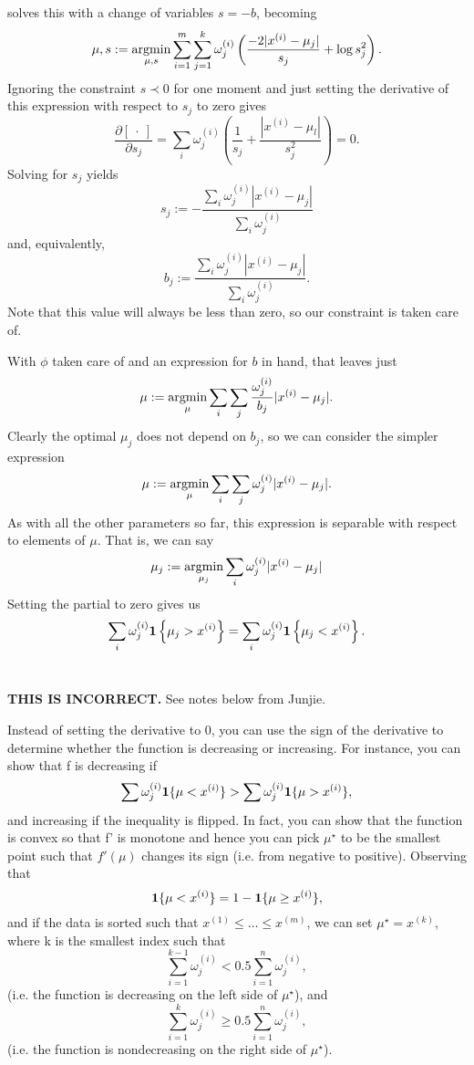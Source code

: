 \documentclass[12pt]{article}
\begin{document}
solves this with a change of variables $s = -b$, becoming
\[
\mu, s := \mathop{\rm argmin}_{\mu, s} \sum_{i=1}^m \sum_{j=1}^k \omega_j^{(i)} \left(  \frac{- 2 |x^{(i)} - \mu_j|}{s_j} + \log s_j^2 \right).
\]
Ignoring the constraint $s \prec 0$ for one moment and just setting the derivative of this expression with respect to $s_j$ to zero gives
\[
\frac{\partial \left[\ \cdot\ \right]}{\partial s_j} = \sum_i \omega_j^{(i)} \left( \frac{1}{s_j} + \frac{|x^{(i)} - \mu_l|}{s_j^2} \right) = 0.
\]
Solving for $s_j$ yields
\[
s_j := - \frac{\sum_i \omega_j^{(i)} | x^{(i)} - \mu_j|}{\sum_i \omega_j^{(i)}}
\]
and, equivalently,
\begin{equation}
\label{sUpdate}
b_j := \frac{\sum_i \omega_j^{(i)} | x^{(i)} - \mu_j|}{\sum_i \omega_j^{(i)}}.
\end{equation}
Note that this value will always be less than zero, so our constraint is taken care of.

With $\phi$ taken care of and an expression for $b$ in hand, that leaves just 
\[
\mu := \mathop{\rm argmin}_\mu \sum_i \sum_j \frac{\omega_j^{(i)}}{b_j} | x^{(i)} - \mu_j |.
\]
Clearly the optimal $\mu_j$ does not depend on $b_j$, so we can consider the simpler expression
\[
\mu := \mathop{\rm argmin}_\mu \sum_i \sum_j \omega_j^{(i)} | x^{(i)} - \mu_j |.
\]
As with all the other parameters so far, this expression is separable with respect to elements of $\mu$. That is, we can say
\[
\mu_j := \mathop{\rm argmin}_{\mu_j} \sum_i \omega_j^{(i)} | x^{(i)} - \mu_j |
\]
Setting the partial to zero gives us
\[
\sum_i \omega_j^{(i)} \mathbf 1 \left\{ \mu_j > x^{(i)} \right\} = \sum_i \omega_j^{(i)} \mathbf 1 \left\{ \mu_j < x^{(i)} \right\}.
\]
 

\textbf{THIS IS INCORRECT.} See notes below from Junjie.

Instead of setting the derivative to 0, you can use the sign of the derivative to determine whether the function is decreasing or increasing. For instance, you can show that f is decreasing if
\[
\sum \omega_j^{(i)} \mathbf 1\{\mu < x^{(i)}\} > \sum \omega_j^{(i)} \mathbf 1 \{ \mu > x^{(i)} \},
\]
and increasing if the inequality is flipped. In fact, you can show that the function is convex so that f' is monotone and hence you can pick $\mu^\star$ to be the smallest point such that $f'(\mu)$ changes its sign (i.e. from negative to positive). Observing that
\[
\mathbf 1 \{ \mu < x^{(i)} \} = 1- \mathbf 1 \{ \mu \geq x^{(i)} \}, 
\]
and if the data is sorted such that $x^{(1)} \leq \dots \leq x^{(m)}$, we can set $\mu^\star = x^{(k)}$, where k is the smallest index such that 
\[
\sum_{i=1}^{k-1} \omega_j^{(i)} < 0.5 \sum_{i=1}^n \omega_j^{(i)},
\]
(i.e. the function is decreasing on the left side of $\mu^\star$), and
\[
\sum_{i=1}^{k} \omega_j^{(i)} 
\geq 0.5 \sum_{i=1}^n \omega_j^{(i)},
\]
(i.e. the function is nondecreasing on the right side of $\mu^\star$).




\end{document}
